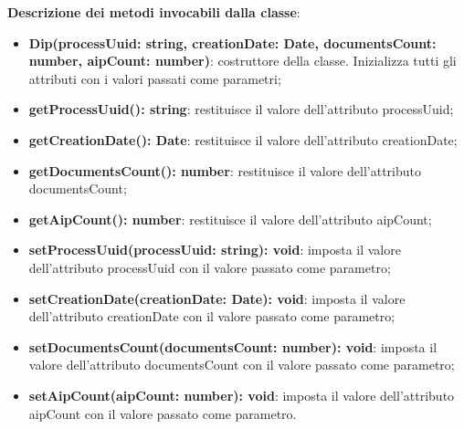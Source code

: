 \documentclass[a4paper,12pt]{article}
\begin{document}
{              \noindent \textbf{Descrizione dei metodi invocabili dalla classe}:
                \begin{itemize}
                    \item \textbf{Dip(processUuid: string, creationDate: Date, documentsCount: number, aipCount: number)}: costruttore della classe. Inizializza tutti gli attributi con i valori passati come parametri;
                    \item \textbf{getProcessUuid(): string}: restituisce il valore dell'attributo processUuid;
                    \item \textbf{getCreationDate(): Date}: restituisce il valore dell'attributo creationDate;
                    \item \textbf{getDocumentsCount(): number}: restituisce il valore dell'attributo documentsCount;
                    \item \textbf{getAipCount(): number}: restituisce il valore dell'attributo aipCount;
                    \item \textbf{setProcessUuid(processUuid: string): void}: imposta il valore dell'attributo processUuid con il valore passato come parametro;
                    \item \textbf{setCreationDate(creationDate: Date): void}: imposta il valore dell'attributo creationDate con il valore passato come parametro;
                    \item \textbf{setDocumentsCount(documentsCount: number): void}: imposta il valore dell'attributo documentsCount con il valore passato come parametro;
                    \item \textbf{setAipCount(aipCount: number): void}: imposta il valore dell'attributo aipCount con il valore passato come parametro.
                \end{itemize}

}
\end{document}
